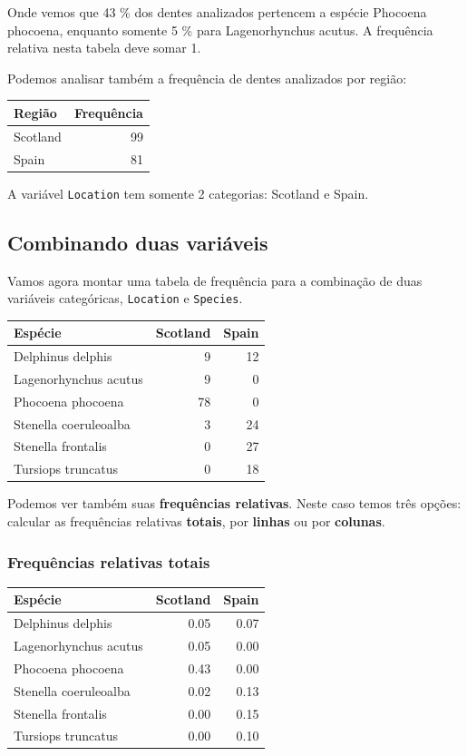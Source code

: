 \documentclass[
]{book}
\begin{document}
Onde vemos que 43 \% dos dentes analizados pertencem a espécie Phocoena phocoena, enquanto somente 5 \% para Lagenorhynchus acutus. A frequência relativa nesta tabela deve somar 1.

Podemos analisar também a frequência de dentes analizados por região:

\begin{tabular}{l|r}
\hline
Região & Frequência\\
\hline
Scotland & 99\\
\hline
Spain & 81\\
\hline
\end{tabular}

A variável \texttt{Location} tem somente 2 categorias: Scotland e Spain.

\hypertarget{combinando-duas-variuxe1veis}{%
\subsection{Combinando duas variáveis}\label{combinando-duas-variuxe1veis}}

Vamos agora montar uma tabela de frequência para a combinação de duas variáveis categóricas, \texttt{Location} e \texttt{Species}.

\begin{tabular}{l|r|r}
\hline
Espécie & Scotland & Spain\\
\hline
Delphinus delphis & 9 & 12\\
\hline
Lagenorhynchus acutus & 9 & 0\\
\hline
Phocoena phocoena & 78 & 0\\
\hline
Stenella coeruleoalba & 3 & 24\\
\hline
Stenella frontalis & 0 & 27\\
\hline
Tursiops truncatus & 0 & 18\\
\hline
\end{tabular}

Podemos ver também suas \textbf{frequências relativas}. Neste caso temos três opções: calcular as frequências relativas \textbf{totais}, por \textbf{linhas} ou por \textbf{colunas}.

\hypertarget{frequuxeancias-relativas-totais}{%
\subsubsection{Frequências relativas totais}\label{frequuxeancias-relativas-totais}}

\begin{tabular}{l|r|r}
\hline
Espécie & Scotland & Spain\\
\hline
Delphinus delphis & 0.05 & 0.07\\
\hline
Lagenorhynchus acutus & 0.05 & 0.00\\
\hline
Phocoena phocoena & 0.43 & 0.00\\
\hline
Stenella coeruleoalba & 0.02 & 0.13\\
\hline
Stenella frontalis & 0.00 & 0.15\\
\hline
Tursiops truncatus & 0.00 & 0.10\\
\hline
\end{tabular}
\end{document}
